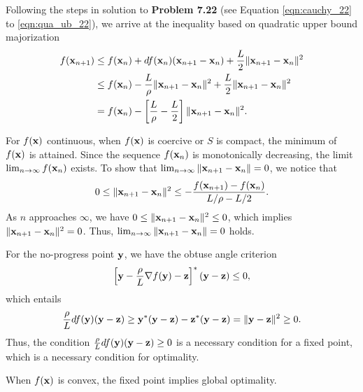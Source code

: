 \documentclass{scrartcl}
\begin{document}
Following the steps in solution to \textbf{Problem 7.22} (see Equation \ref{eqn:cauchy_22} to \ref{eqn:qua_ub_22}), we arrive at the inequality based on quadratic
upper bound majorization
\begin{equation}
    \begin{split}
        f(\mathbf{x}_{n+1}) & \le f(\mathbf{x}_n) + df(\mathbf{x}_n)(\mathbf{x}_{n+1}-\mathbf{x}_n)+{L \over 2} \|\mathbf{x}_{n+1} - \mathbf{x}_n\|^2 \\
                        & \le f(\mathbf{x}_n) - {L \over \rho} \|\mathbf{x}_{n+1} - \mathbf{x}_{n}\|^2 +{L \over 2} \|\mathbf{x}_{n+1} - \mathbf{x}_n\|^2 \\
                        & = f(\mathbf{x}_n) - \left[ {L \over \rho} - {L \over 2} \right] \|\mathbf{x}_{n+1} - \mathbf{x}_n\|^2 .
    \end{split}
\end{equation}

For $f(\mathbf{x})$ continuous, when $f(\mathbf{x})$ is coercive or $S$ is compact, the minimum of $f(\mathbf{x})$ is attained. Since the sequence $f(\mathbf{x}_n)$ is monotonically
decreasing, the limit $\lim_{n \rightarrow \infty} f(\mathbf{x}_n)$ exists. To show that $\lim_{n \rightarrow \infty} \|\mathbf{x}_{n+1}-\mathbf{x}_n\| = 0$, we notice that
\begin{equation}
   0 \le \|\mathbf{x}_{n+1}-\mathbf{x}_n\|^2 \le -{ {f(\mathbf{x}_{n+1})-f(\mathbf{x}_{n})} \over {L/\rho - L/2}}.
\end{equation}
As $n$ approaches $\infty$, we have $0 \le \|\mathbf{x}_{n+1}-\mathbf{x}_n\|^2 \le 0$, which implies $\|\mathbf{x}_{n+1}-\mathbf{x}_n\|^2 = 0$.
Thus, $\lim_{n \rightarrow \infty} \|\mathbf{x}_{n+1}-\mathbf{x}_n\| = 0$ holds.

For the no-progress point $\mathbf{y}$, we have the obtuse angle criterion
\begin{equation}
\left[ \mathbf{y} - {\rho \over L} \nabla f(\mathbf{y}) - \mathbf{z} \right]^*(\mathbf{y}-\mathbf{z}) \le 0,
\end{equation}
which entails
\begin{equation}
{\rho \over L} df(\mathbf{y})(\mathbf{y}-\mathbf{z}) \ge \mathbf{y}^*(\mathbf{y}-\mathbf{z}) - \mathbf{z}^*(\mathbf{y}-\mathbf{z}) = \|\mathbf{y} - \mathbf{z}\|^2 \ge 0.
\end{equation}
Thus, the condition ${\rho \over L} df(\mathbf{y})(\mathbf{y}-\mathbf{z}) \ge 0$ is a necessary condition for a fixed point, which is a necessary condition for
optimality.

When $f(\mathbf{x})$ is convex, the fixed point implies global optimality.



\end{document}
